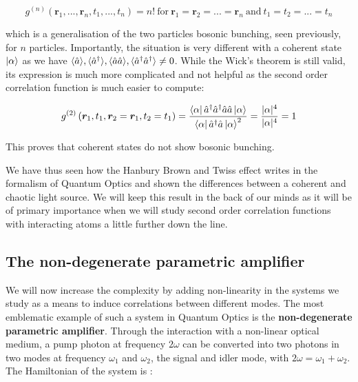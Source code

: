 \begin{equation}
    g^{(n)} (\bm{r}_1,...,\bm{r}_n,t_1,...,t_n) = n! \ \mathrm{for} \ \bm{r}_1=\bm{r}_2= ... =\bm{r}_n \ \mathrm{and} \ t_1=t_2=...=t_n
\end{equation}

\noindent which is a generalisation of the two particles bosonic bunching, seen previously, for $n$ particles. Importantly, the situation is very different with a coherent state $\ket{\alpha}$ as we have $\langle \hat{a} \rangle, \langle \hat{a}^{\dagger} \rangle, \langle\hat{a} \hat{a}\rangle, \langle \hat{a}^{\dagger} \hat{a}^{\dagger} \rangle \neq 0$. While the Wick's theorem is still valid, its expression is much more complicated and not helpful as the second order correlation function is much easier to compute:


\begin{equation}
     g^{(2)}\left(\bm{r}_{1}, t_{1}, \bm{r}_{2}=\bm{r}_1, t_{2}=t_1\right) = \frac{\bra{\alpha} \hat{a}^{\dagger} \hat{a}^{\dagger} \hat{a} \hat{a} \ket{\alpha}} {\bra{\alpha} \hat{a}^{\dagger} \hat{a} \ket{\alpha}^{2}} = \frac{|\alpha|^4}{|\alpha|^4}=1
\end{equation}

\label{sec:coherent_g2}

\noindent This proves that coherent states do not show bosonic bunching.

We have thus seen how the Hanbury Brown and Twiss effect writes in the formalism of Quantum Optics and shown the differences between a coherent and chaotic light source. We will keep this result in the back of our minds as it will be of primary importance when we will study second order correlation functions with interacting atoms a little further down the line.

\subsection{The non-degenerate parametric amplifier}

\label{sec:amp_parametric}

We will now increase the complexity by adding non-linearity in the systems we study as a means to induce correlations between different modes. The most emblematic example of such a system in Quantum Optics is the \textbf{non-degenerate parametric amplifier}. Through the interaction with a non-linear optical medium, a pump photon at frequency $2 \omega$ can be converted into two photons in two modes at frequency $\omega_1$ and $\omega_2$, the signal and idler mode, with $2 \omega = \omega_1 + \omega_2$. The Hamiltonian of the system is \cite{walls2008}:

